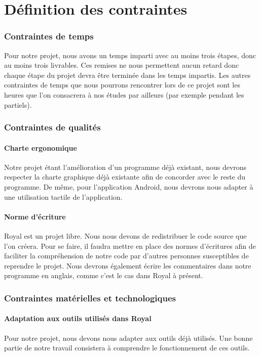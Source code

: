 \part{Définition des contraintes}


\section{Contraintes de temps}
Pour notre projet, nous avons un temps imparti avec au moins trois étapes, donc au moins trois livrables. Ces remises ne nous permettent aucun retard donc chaque étape du projet devra être terminée dans les temps impartis.
Les autres contraintes de temps que nous pourrons rencontrer lors de ce projet sont les heures que l'on consacrera à nos études par ailleurs (par exemple pendant les partiels). 

\section{Contraintes de qualités}

\subsection{Charte ergonomique}
Notre projet étant l'amélioration d'un programme déjà existant, nous devrons respecter la charte graphique déjà existante afin de concorder avec le reste du programme. 
De même, pour l'application Android, nous devrons nous adapter à une utilisation tactile de l'application. 

\subsection{Norme d'écriture}
Royal est un projet libre. 
Nous nous devons de redistribuer le code source que l'on créera.
Pour se faire, il faudra mettre en place des normes d'écritures afin de faciliter la compréhension de notre code par d'autres personnes susceptibles de reprendre le projet. 
Nous devrons également écrire les commentaires dans notre programme en anglais, comme c'est le cas dans Royal à présent.

\section{Contraintes matérielles et technologiques}

\subsection{Adaptation aux outils utilisés dans Royal}
Pour notre projet, nous devons nous adapter aux outils déjà utilisés. Une bonne partie de notre travail consistera à comprendre le fonctionnement de ces outils.


